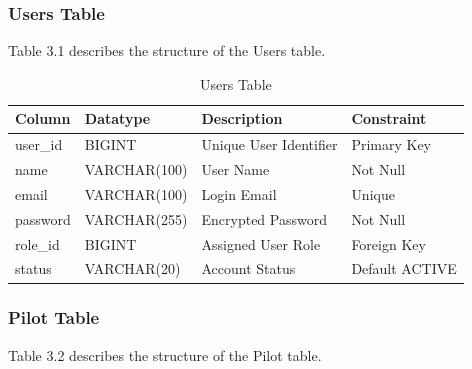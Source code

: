 \documentclass[12pt,a4paper]{report}
\begin{document}
\subsubsection{Users Table}

Table 3.1 describes the structure of the Users table.

\begin{table}[H]
\centering
\caption{Users Table}

\begin{tabular}{|p{3.5cm}|p{2.5cm}|p{5cm}|p{2.5cm}|}

\hline
\textbf{Column} & \textbf{Datatype} & \textbf{Description} & \textbf{Constraint}\\
\hline

user\_id & BIGINT & Unique User Identifier & Primary Key\\
\hline

name & VARCHAR(100) & User Name & Not Null\\
\hline

email & VARCHAR(100) & Login Email & Unique\\
\hline

password & VARCHAR(255) & Encrypted Password & Not Null\\
\hline

role\_id & BIGINT & Assigned User Role & Foreign Key\\
\hline

status & VARCHAR(20) & Account Status & Default ACTIVE\\
\hline

\end{tabular}

\end{table}

\subsubsection{Pilot Table}

Table 3.2 describes the structure of the Pilot table.
\end{document}
